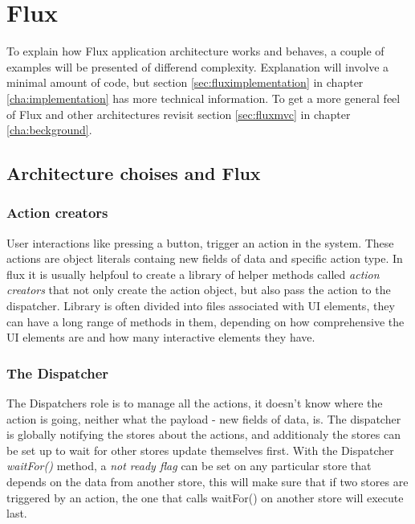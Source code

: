 \newpage

\section{Flux}
To explain how Flux application architecture works and behaves, a couple of examples will be presented of differend complexity. Explanation will involve a minimal amount of code, but section \ref{sec:fluximplementation} in chapter \ref{cha:implementation} has more technical information. To get a more general feel of Flux and other architectures revisit section \ref{sec:fluxmvc} in chapter \ref{cha:beckground}.

\subsection{Architecture choises and Flux}
\subsubsection*{Action creators}
User interactions like pressing a button, trigger an action in the system. These actions are object literals containg new fields of data and specific action type. In flux it is usually helpfoul to create a library of helper methods called \emph{action creators} that not only create the action object, but also pass the action to the dispatcher. Library is often divided into files associated with UI elements, they can have a long range of methods in them, depending on how comprehensive the UI elements are and how many interactive elements they have.

\subsubsection*{The Dispatcher}
The Dispatchers role is to manage all the actions, it doesn't know where the action is going, neither what the payload - new fields of data, is. The dispatcher is globally notifying the stores about the actions, and additionaly the stores can be set up to wait for other stores update themselves first. With the Dispatcher \emph{waitFor()} method, a \emph{not ready flag} can be set on any particular store that depends on the data from another store, this will make sure that if two stores are triggered by an action, the one that calls waitFor() on another store will execute last. 

